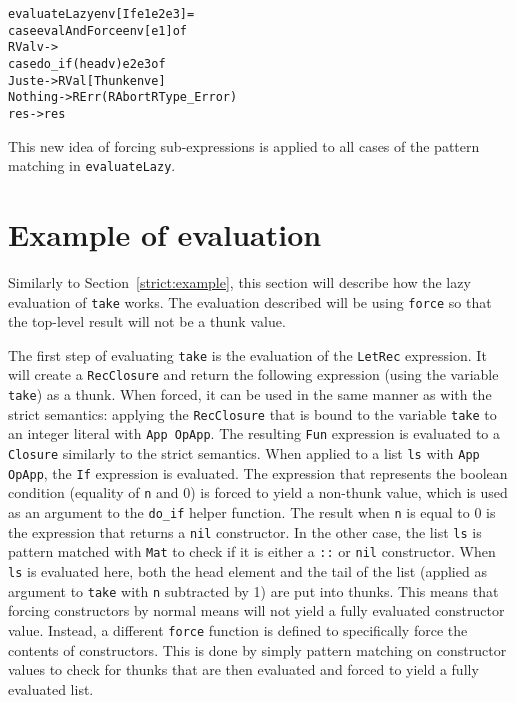 \begin{alltt}
  evaluateLazy env [If e1 e2 e3]   =
    case evalAndForce env [e1] of
      RVal v ->
        case do_if (head v) e2 e3 of
          Just e  -> RVal [Thunk env e]
          Nothing -> RErr (RAbort RType_Error)
      res -> res
\end{alltt}

This new idea of forcing sub-expressions is applied to all cases of the
pattern matching in \texttt{evaluateLazy}.

\section{Example of evaluation}
\label{lazy:example}
Similarly to Section~\ref{strict:example}, this section will describe how the
lazy evaluation of \texttt{take} works. The evaluation described will be using
\texttt{force} so that the top-level result will not be a thunk value.

The first step of evaluating \texttt{take} is the evaluation of the
\texttt{LetRec} expression. It will create a \texttt{RecClosure} and return
the following expression (using the variable \texttt{take}) as a thunk.
When forced, it can be used in the same manner as with the strict semantics:
applying the \texttt{RecClosure} that is bound to the variable \texttt{take}
to an integer literal with \texttt{App OpApp}. The resulting \texttt{Fun}
expression is evaluated to a \texttt{Closure} similarly to the strict semantics.
When applied to a list \texttt{ls} with \texttt{App OpApp}, the \texttt{If}
expression is evaluated. The expression that represents the boolean condition
(equality of \texttt{n} and 0) is
forced to yield a non-thunk value, which is used as an argument to the
\texttt{do\_if} helper function. The result when \texttt{n} is equal to 0 is the
expression that returns a \texttt{nil} constructor. In the other case, the list
\texttt{ls} is pattern matched with \texttt{Mat} to check if it is either a
\texttt{::} or \texttt{nil} constructor. When \texttt{ls} is evaluated here,
both the head element and the tail of the list (applied as argument to
\texttt{take} with \texttt{n} subtracted by 1) are put into thunks. This means
that forcing constructors by normal means will not yield
a fully evaluated constructor value. Instead, a different \texttt{force} function
is defined to specifically force the contents of constructors. This is done by
simply pattern matching on constructor values to check for thunks that are then
evaluated and forced to yield a fully evaluated list.


